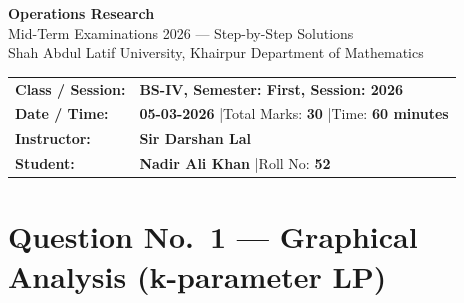 \documentclass[12pt]{article}
\begin{document}
\thispagestyle{empty}

\begin{tcolorbox}[
  enhanced, arc=0pt, boxrule=0pt,
  colback=primary, colframe=primary,
  left=16pt, right=16pt, top=18pt, bottom=14pt,
  borderline south={4pt}{0pt}{accent},
]
  \centering
  {\huge\bfseries\color{white} Operations Research}\\[4pt]
  {\large\color{accent} Mid-Term Examinations 2026 --- Step-by-Step Solutions}\\[6pt]
  {\normalsize\color{lightbg}
    Shah Abdul Latif University, Khairpur \quad\textbullet\quad Department of Mathematics}
\end{tcolorbox}

\vspace{4pt}

\begin{tcolorbox}[
  enhanced, arc=0pt, boxrule=0pt,
  colback=white, colframe=white,
  borderline north={1.5pt}{0pt}{accent!60},
  borderline south={1.5pt}{0pt}{accent!60},
  left=16pt, right=16pt, top=12pt, bottom=12pt,
]
  \begin{tabular}{p{3.5cm} p{9cm}}
    \textcolor{primary}{\textbf{Class / Session:}}
      & \textbf{BS-IV, Semester: First, Session: 2026} \\[4pt]
    \textcolor{primary}{\textbf{Date / Time:}}
      & \textbf{05-03-2026} \quad|\quad Total Marks: \textbf{30} \quad|\quad Time: \textbf{60 minutes} \\[4pt]
    \textcolor{primary}{\textbf{Instructor:}}
      & \textbf{Sir Darshan Lal} \\[4pt]
    \textcolor{primary}{\textbf{Student:}}
      & \textbf{Nadir Ali Khan} \quad|\quad Roll No: \textbf{52} \\
  \end{tabular}
\end{tcolorbox}

\vspace{14pt}

\section{Question No.\ 1 --- Graphical Analysis (k-parameter LP)}
\end{document}
